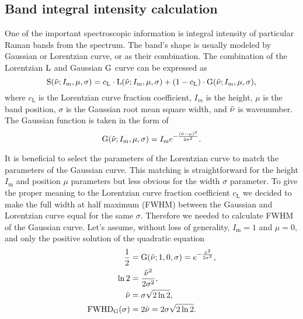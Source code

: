 \subsection{Band integral intensity calculation}
\label{band_intensities}

One of the important spectroscopic information is integral intensity of
particular Raman bands from the spectrum. The band's shape is usually modeled
by Gaussian or Lorentzian curve, or as their combination. The combination of
the Lorentzian $\operatorname{L}$ and Gaussian $\operatorname{G}$ curve can be expressed as
\begin{equation}
	\func{S}(\wn; I_\text{m}, \mu, \sigma) =
		c_\text{L} \cdot \func{L}(\wn; I_\text{m}, \mu, \sigma)
		+ (1 - c_\text{L}) \cdot \func{G}(\wn; I_\text{m}, \mu, \sigma),
	\label{\eqnlabel{band_intensities:single_shape}}
\end{equation}
where $c_\text{L}$ is the Lorentzian curve fraction coefficient, $I_m$ is the
height, $\mu$ is the band position, $\sigma$ is the Gaussian root mean square
width, and $\tilde{\nu}$ is wavenumber. The Gaussian function is taken in the form of
\begin{equation*}
	\operatorname{G}(\tilde{\nu}; I_\text{m}, \mu, \sigma) =
		I_\text{m} e^{-\frac{(\tilde{\nu} - \mu)^2}{2\sigma^2}}.
\end{equation*}

It is beneficial to select the parameters of the Lorentzian curve to match the
parameters of the Gaussian curve. This matching is straightforward for the
height $I_\text{m}$ and position $\mu$ parameters but less obvious for the
width $\sigma$ parameter. To give the proper meaning to the Lorentzian curve
fraction coefficient $c_\text{L}$ we decided to make the full width at half
maximum (FWHM) between the Gaussian and Lorentzian curve equal for the same
$\sigma$. Therefore we needed to calculate FWHM of the Gaussian curve. Let's
assume, without loss of generality,
$I_\text{m} = 1$
and
$\mu = 0$,
and only the positive solution of the quadratic equation
\begin{align}
	\frac{1}{2} &= \func{G}(\wn; 1, 0, \sigma)
		= e^{-\frac{\wn^2}{2\sigma^2}}, \nonumber \\
	\func{ln}2  &= \frac{\wn^2}{2\sigma^2}, \nonumber \\
	\wn         &= \sigma\sqrt{2\ln2},
		\label{\eqnlabel{band_intensities:HWHM}}\\
	\func{FWHD}_\text{G}(\sigma)
	            &= 2\wn = 2\sigma\sqrt{2\ln2}. \nonumber
\end{align}

